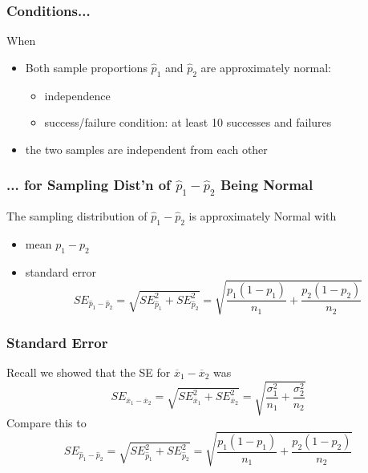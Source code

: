 \documentclass[handout]{beamer}
\newcommand{\blue}[1]{\textcolor{blue2}{#1}}
\newcommand{\xbar}{\overline{x}}
\newcommand{\phat}{\widehat{p}}
\begin{document}
\begin{frame}[fragile]
\frametitle{Conditions...}

%
%
When
\begin{itemize}
\item Both sample proportions $\widehat{p}_1$ and $\widehat{p}_2$ are approximately \blue{normal}:
\pause\begin{itemize}
\item independence
\item success/failure condition: at least 10 successes and failures
\end{itemize}
\pause\item the two samples are independent from each other
\end{itemize}

\end{frame}


\begin{frame}[fragile]
\frametitle{... for Sampling Dist'n of $\phat_1-\phat_2$ Being Normal}

%
%
The sampling distribution of $\phat_1 - \phat_2$ is approximately Normal with
\begin{itemize}
\item mean $p_1 - p_2$
\item standard error
\[
SE_{\phat_1 - \phat_2} = \sqrt{SE_{\phat_1}^2 + SE_{\phat_2}^2} = 
\sqrt{\frac{p_1(1-p_1)}{n_1} + \frac{p_2(1-p_2)}{n_2}}
\]
\end{itemize}

\end{frame}


\begin{frame}[fragile]
\frametitle{Standard Error}

%
%
Recall we showed that the SE for $\xbar_1-\xbar_2$ was
\[
SE_{\xbar_1-\xbar_2} = \sqrt{SE_{\xbar_1}^2 + SE_{\xbar_2}^2} = 
\sqrt{\frac{\sigma_1^2}{n_1} + \frac{\sigma_2^2}{n_2}}
\]
\pause Compare this to 
\[
SE_{\phat_1 - \phat_2} = \sqrt{SE_{\phat_1}^2 + SE_{\phat_2}^2} = 
\sqrt{\frac{p_1(1-p_1)}{n_1} + \frac{p_2(1-p_2)}{n_2}}
\]

\end{frame}
\end{document}
